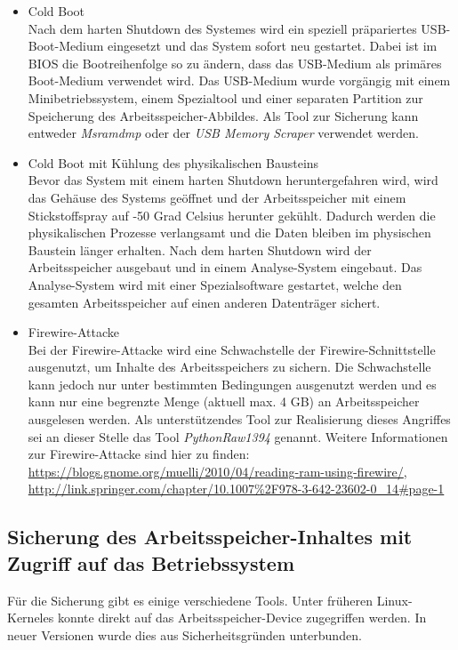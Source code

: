 \begin{itemize}
\item Cold Boot\\
Nach dem harten Shutdown des Systemes wird ein speziell präpariertes USB-Boot-Medium eingesetzt und das System sofort neu gestartet. Dabei ist im BIOS die Bootreihenfolge so zu ändern, dass das USB-Medium als primäres Boot-Medium verwendet wird. Das USB-Medium wurde vorgängig mit einem Minibetriebssystem, einem Spezialtool und einer separaten Partition zur Speicherung des Arbeitsspeicher-Abbildes. Als Tool zur Sicherung kann entweder \textit{Msramdmp} oder der \textit{USB Memory Scraper} verwendet werden.

\item Cold Boot mit Kühlung des physikalischen Bausteins\\
Bevor das System mit einem harten Shutdown heruntergefahren wird, wird das Gehäuse des Systems geöffnet und der Arbeitsspeicher mit einem Stickstoffspray auf -50 Grad Celsius herunter gekühlt. Dadurch werden die physikalischen Prozesse verlangsamt und die Daten bleiben im physischen Baustein länger erhalten. Nach dem harten Shutdown wird der Arbeitsspeicher ausgebaut und in einem Analyse-System  eingebaut. Das Analyse-System wird mit einer Spezialsoftware gestartet, welche den gesamten Arbeitsspeicher auf einen anderen Datenträger sichert.

\item Firewire-Attacke\\
Bei der Firewire-Attacke wird eine Schwachstelle der Firewire-Schnittstelle ausgenutzt, um Inhalte des Arbeitsspeichers zu sichern. Die Schwachstelle kann jedoch nur unter bestimmten Bedingungen ausgenutzt werden und es kann nur eine begrenzte Menge (aktuell max. 4 GB) an Arbeitsspeicher ausgelesen werden. Als unterstützendes Tool zur Realisierung dieses Angriffes sei an dieser Stelle das Tool \textit{PythonRaw1394} genannt. Weitere Informationen zur Firewire-Attacke sind hier zu finden: \url{https://blogs.gnome.org/muelli/2010/04/reading-ram-using-firewire/}, \url{http://link.springer.com/chapter/10.1007%2F978-3-642-23602-0_14#page-1}
\end{itemize}

\subsection{Sicherung des Arbeitsspeicher-Inhaltes mit Zugriff auf das Betriebssystem}
Für die Sicherung gibt es einige verschiedene Tools. Unter früheren Linux-Kerneles konnte direkt auf das Arbeitsspeicher-Device zugegriffen werden. In neuer Versionen wurde dies aus Sicherheitsgründen unterbunden.

